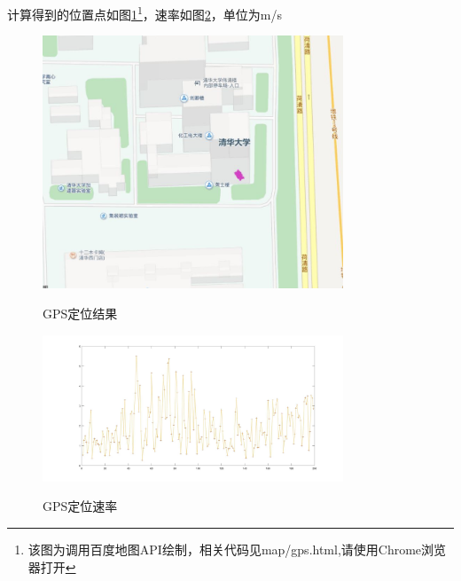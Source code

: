     计算得到的位置点如图\ref{gps}\footnote{该图为调用百度地图API绘制，相关代码见map/gps.html,请使用Chrome浏览器打开}，速率如图\ref{v_gps}，单位为m/s
\begin{figure}
    \centering
    \includegraphics[width=0.8\textwidth]{pic/gps.jpg}\\
    \caption{GPS定位结果}
    \label{gps}
\end{figure}
\begin{figure}
    \centering
    \includegraphics[width=0.8\textwidth]{pic/v_gps.jpg}\\
    \caption{GPS定位速率}
    \label{v_gps}
\end{figure}


